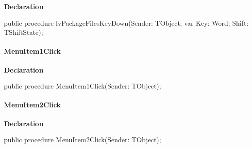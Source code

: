\documentclass{report}
\newif\ifpdf
\begin{document}
\label{prjwizard.TfrmProjectWizard-lvPackageFilesKeyDown}
\begin{list}{}{
\setlength{\itemindent}{0cm}
\setlength{\listparindent}{0cm}
\setlength{\leftmargin}{\evensidemargin}
\addtolength{\leftmargin}{\tmplength}
\settowidth{\labelsep}{X}
\addtolength{\leftmargin}{\labelsep}
\setlength{\labelwidth}{\tmplength}
}
\item[\textbf{Declaration}\hfill]
\ifpdf
\begin{flushleft}
\fi
\begin{ttfamily}
public procedure lvPackageFilesKeyDown(Sender: TObject; var Key: Word; Shift: TShiftState);\end{ttfamily}

\ifpdf
\end{flushleft}
\fi

\end{list}
\paragraph*{MenuItem1Click}\hspace*{\fill}

\label{prjwizard.TfrmProjectWizard-MenuItem1Click}
\begin{list}{}{
\setlength{\itemindent}{0cm}
\setlength{\listparindent}{0cm}
\setlength{\leftmargin}{\evensidemargin}
\addtolength{\leftmargin}{\tmplength}
\settowidth{\labelsep}{X}
\addtolength{\leftmargin}{\labelsep}
\setlength{\labelwidth}{\tmplength}
}
\item[\textbf{Declaration}\hfill]
\ifpdf
\begin{flushleft}
\fi
\begin{ttfamily}
public procedure MenuItem1Click(Sender: TObject);\end{ttfamily}

\ifpdf
\end{flushleft}
\fi

\end{list}
\paragraph*{MenuItem2Click}\hspace*{\fill}

\label{prjwizard.TfrmProjectWizard-MenuItem2Click}
\begin{list}{}{
\setlength{\itemindent}{0cm}
\setlength{\listparindent}{0cm}
\setlength{\leftmargin}{\evensidemargin}
\addtolength{\leftmargin}{\tmplength}
\settowidth{\labelsep}{X}
\addtolength{\leftmargin}{\labelsep}
\setlength{\labelwidth}{\tmplength}
}
\item[\textbf{Declaration}\hfill]
\ifpdf
\begin{flushleft}
\fi
\begin{ttfamily}
public procedure MenuItem2Click(Sender: TObject);\end{ttfamily}

\ifpdf
\end{flushleft}
\fi

\end{list}
\end{document}
